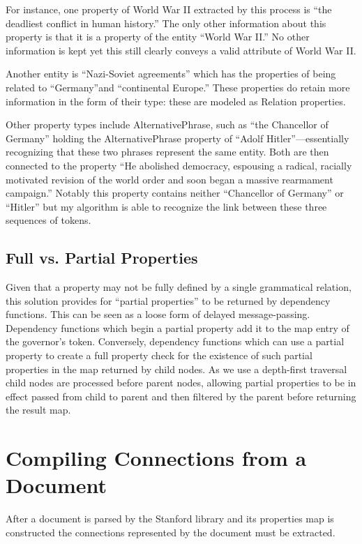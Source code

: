 For instance, one property of World War II extracted by this process is ``the deadliest conflict in human history.''  The only other information about this property is that it is a property of the entity ``World War II.''  No other information is kept yet this still clearly conveys a valid attribute of World War II.

Another entity is ``Nazi-Soviet agreements'' which has the properties of being related to ``Germany''and ``continental Europe.''  These properties do retain more information in the form of their type: these are modeled as Relation properties.

Other property types include AlternativePhrase, such as ``the Chancellor of Germany'' holding the AlternativePhrase property of ``Adolf Hitler''---essentially recognizing that these two phrases represent the same entity.  Both are then connected to the property ``He abolished democracy, espousing a radical, racially motivated revision of the world order and soon began a massive rearmament campaign.''  Notably this property contains neither ``Chancellor of Germany'' or ``Hitler'' but my algorithm is able to recognize the link between these three sequences of tokens.

\subsection{Full vs. Partial Properties}

Given that a property may not be fully defined by a single grammatical relation, this solution provides for ``partial properties'' to be returned by dependency functions.  This can be seen as a loose form of delayed message-passing.  Dependency functions which begin a partial property add it to the map entry of the governor's token.  Conversely, dependency functions which can use a partial property to create a full property check for the existence of such partial properties in the map returned by child nodes.  As we use a depth-first traversal child nodes are processed before parent nodes, allowing partial properties to be in effect passed from child to parent and then filtered by the parent before returning the result map.


\section{Compiling Connections from a Document}

After a document is parsed by the Stanford library and its properties map is constructed the connections represented by the document must be extracted.  

